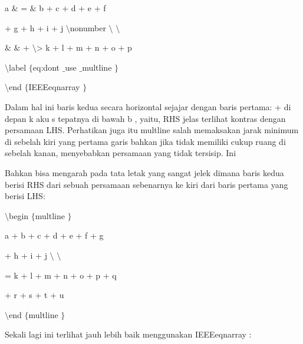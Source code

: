\begin{itemize}
\vspace{12pt}
\noindent 
a  $  \&  $ =  $  \&  $ b + c + d + e + f \par
\vspace{12pt}
\noindent 
+ g + h + i + j  $  \setminus  $nonumber $  \setminus  $ $  \setminus  $ \par
\vspace{12pt}
\noindent 
 $  \&  $ $  \&  $ + $  \setminus  $> k + l + m + n + o + p \par
\vspace{12pt}
\noindent 
 $  \setminus  $label $  \{  $eq:dont $  \_  $use $  \_  $multline $  \}  $ \par
\vspace{12pt}
\noindent 
 $  \setminus  $end $  \{  $IEEEeqnarray $  \}  $ \par
\vspace{12pt}
\noindent 
 \hspace*{0.5in} Dalam hal ini baris kedua secara horizontal sejajar dengan baris pertama: + di depan k aku s tepatnya di bawah b , yaitu, RHS jelas terlihat kontras dengan persamaan LHS. Perhatikan juga itu multline salah memaksakan jarak minimum di sebelah kiri yang pertama garis bahkan jika tidak memiliki cukup ruang di sebelah kanan, menyebabkan persamaan yang tidak tersisip. Ini \par
\noindent 
Bahkan bisa mengarah pada tata letak yang sangat jelek dimana baris kedua berisi RHS dari sebuah persamaan sebenarnya ke kiri dari baris pertama yang berisi LHS: \par
\noindent 
 $  \setminus  $begin $  \{  $multline $  \}  $ \par
\vspace{12pt}
\noindent 
a + b + c + d + e + f + g \par
\vspace{12pt}
\noindent 
+ h + i + j  $  \setminus  $ $  \setminus  $ \par
\vspace{12pt}
\noindent 
= k + l + m + n + o + p + q \par
\vspace{12pt}
\noindent 
+ r + s + t + u \par
\vspace{12pt}
\noindent 
 $  \setminus  $end $  \{  $multline $  \}  $ \par
\noindent 
\vspace{16pt}
\noindent 
Sekali lagi ini terlihat jauh lebih baik menggunakan IEEEeqnarray : \par

\end{itemize}
